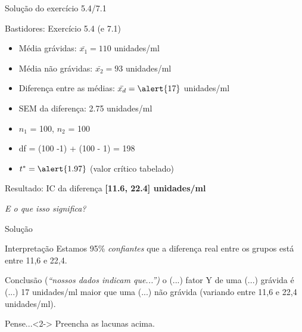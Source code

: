 \documentclass{beamer}
\begin{document}
\begin{frame}{{\small Solução do exercício 5.4/7.1}}
  \begin{exampleblock}{Bastidores: Exercício 5.4 (e 7.1)}
    \tiny
    \begin{itemize}
    \item Média grávidas: $\bar{x_1} = 110$ unidades/ml
    \item Média não grávidas: $\bar{x_2} = 93$ unidades/ml
    \item Diferença entre as médias: $\bar{x_d} = \alert{17}$ unidades/ml
    \item SEM da diferença: \alert{2.75} unidades/ml
    \item $n_1$ = 100, $n_2$ = 100
    \item df = (100 -1) + (100 - 1) = \alert{198}
    \item $t^{*} = \alert{1.97}$ {\tiny(valor crítico tabelado)}
    \end{itemize}
  \end{exampleblock}
  \begin{exampleblock}{Resultado: IC da diferença}
    \centering
    {\bf [11.6, 22.4] unidades/ml}
  \end{exampleblock}
  \begin{center}
    \small
    {\em E o que isso significa?}
  \end{center}
\end{frame}

\begin{frame}{Solução}
  \begin{exampleblock}{Interpretação}
    Estamos 95\% {\em confiantes} que a diferença \alert{real} entre os grupos está entre 11,6 e 22,4.
  \end{exampleblock}

  \bigskip
  \begin{exampleblock}{Conclusão {(\em ``nossos dados indicam que...'')}}
    \small
    o (...) fator Y de uma (...) grávida é (...) 17 unidades/ml maior que uma (...) não grávida (variando entre 11,6 e 22,4 unidades/ml).
  \end{exampleblock}
  \begin{block}{Pense...}<2->
    Preencha as lacunas acima.
  \end{block}
\end{frame}
\end{document}
